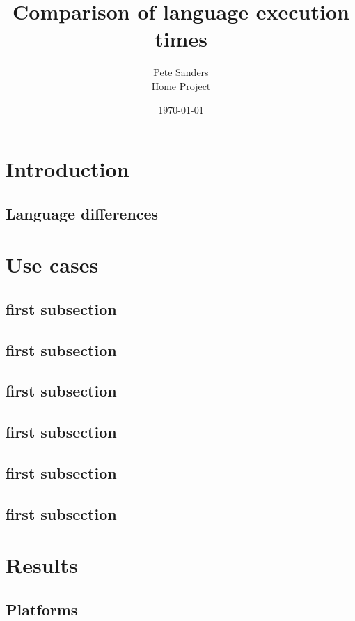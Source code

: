 \documentclass[a4paper,11pt]{article}
\title{Comparison of language execution times}
\author{Pete Sanders  \\
	Home Project
	}
\date{\today}
\begin{document}
\maketitle

\tableofcontents

\section{Introduction}

\subsection{Language differences}

\section{Use cases}

\subsection{}

\subsection{first subsection}
\subsection{first subsection}
\subsection{first subsection}
\subsection{first subsection}
\subsection{first subsection}
\subsection{first subsection}

\section{Results}

\subsection{Platforms}
\end{document}
